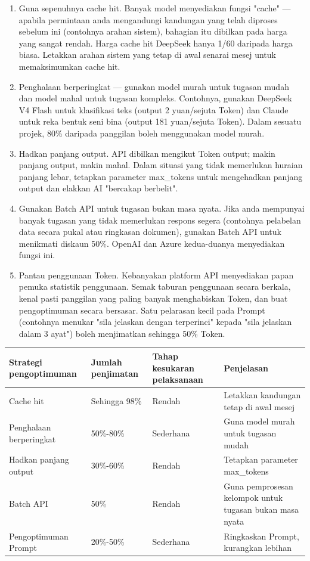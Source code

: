 \begin{enumerate}
  \item Guna sepenuhnya cache hit. Banyak model menyediakan fungsi "cache" — apabila permintaan anda mengandungi kandungan yang telah diproses sebelum ini (contohnya arahan sistem), bahagian itu dibilkan pada harga yang sangat rendah. Harga cache hit DeepSeek hanya 1/60 daripada harga biasa. Letakkan arahan sistem yang tetap di awal senarai mesej untuk memaksimumkan cache hit.
  \item Penghalaan berperingkat — gunakan model murah untuk tugasan mudah dan model mahal untuk tugasan kompleks. Contohnya, gunakan DeepSeek V4 Flash untuk klasifikasi teks (output 2 yuan/sejuta Token) dan Claude untuk reka bentuk seni bina (output 181 yuan/sejuta Token). Dalam sesuatu projek, 80\% daripada panggilan boleh menggunakan model murah.
  \item Hadkan panjang output. API dibilkan mengikut Token output; makin panjang output, makin mahal. Dalam situasi yang tidak memerlukan huraian panjang lebar, tetapkan parameter max\_tokens untuk mengehadkan panjang output dan elakkan AI "bercakap berbelit".
  \item Gunakan Batch API untuk tugasan bukan masa nyata. Jika anda mempunyai banyak tugasan yang tidak memerlukan respons segera (contohnya pelabelan data secara pukal atau ringkasan dokumen), gunakan Batch API untuk menikmati diskaun 50\%. OpenAI dan Azure kedua-duanya menyediakan fungsi ini.
  \item Pantau penggunaan Token. Kebanyakan platform API menyediakan papan pemuka statistik penggunaan. Semak taburan penggunaan secara berkala, kenal pasti panggilan yang paling banyak menghabiskan Token, dan buat pengoptimuman secara bersasar. Satu pelarasan kecil pada Prompt (contohnya menukar "sila jelaskan dengan terperinci" kepada "sila jelaskan dalam 3 ayat") boleh menjimatkan sehingga 50\% Token.
\end{enumerate}

\begin{center}
\begin{tabularx}{\linewidth}{|X|X|X|X|}
\hline
\textbf{Strategi pengoptimuman} & \textbf{Jumlah penjimatan} & \textbf{Tahap kesukaran pelaksanaan} & \textbf{Penjelasan} \tabularnewline
\hline
Cache hit & Sehingga 98\% & Rendah & Letakkan kandungan tetap di awal mesej \tabularnewline
Penghalaan berperingkat & 50\%-80\% & Sederhana & Guna model murah untuk tugasan mudah \tabularnewline
Hadkan panjang output & 30\%-60\% & Rendah & Tetapkan parameter max\_tokens \tabularnewline
Batch API & 50\% & Rendah & Guna pemprosesan kelompok untuk tugasan bukan masa nyata \tabularnewline
Pengoptimuman Prompt & 20\%-50\% & Sederhana & Ringkaskan Prompt, kurangkan lebihan \tabularnewline
\hline
\end{tabularx}
\end{center}

